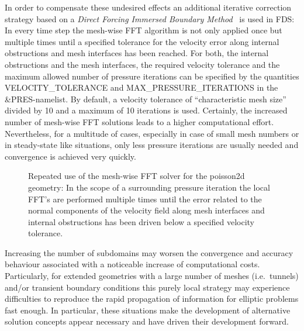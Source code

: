 In order to compensate these undesired effects an additional iterative correction strategy based on a {\it Direct Forcing Immersed Boundary Method}~\cite{Fadlun:2000} is used in FDS: In every time step the mesh-wise FFT algorithm is not only applied once but multiple times until a specified tolerance for the velocity error along internal obstructions and mesh interfaces has been reached. 
For both, the internal obstructions and the mesh interfaces, the required velocity tolerance and the maximum allowed number of pressure iterations can be specified by the quantities {\ct VELOCITY\_TOLERANCE} and {\ct  MAX\_PRESSURE\_ITERATIONS} 
in the {\ct \&PRES}-namelist. By default, a velocity tolerance of ``characteristic mesh size'' divided by 10 and a maximum of 10 iterations is used. 
%
Certainly, the increased number of mesh-wise FFT solutions leads to a higher computational effort. Nevertheless, for a multitude of cases, especially in case of  small mesh numbers or in steady-state like situations, only less pressure iterations are usually needed and convergence is achieved very quickly.

\begin{figure}[h]
\begin{center}

\caption[Mesh-wise FFT-methods with pressure correction]{Repeated use of the mesh-wise FFT solver for the {\ct poisson2d} geometry: In the scope of a surrounding pressure iteration the local FFT's are performed multiple times until the error related to the normal components of the velocity field along mesh interfaces and internal obstructions has been driven below a specified velocity tolerance.}
\label{FIG_SCARC_local_ffts_ite}%
\end{center}
\end{figure}

Increasing the number of subdomains may worsen the convergence and accuracy behaviour associated with a noticeable increase of computational costs.
Particularly, for extended geometries with a large number of meshes (i.e.\ tunnels) and/or transient boundary conditions this purely local strategy may experience difficulties to reproduce the rapid propagation of information for elliptic problems fast enough. In particular, these situations make the development of alternative solution concepts appear necessary and have driven their development forward.

